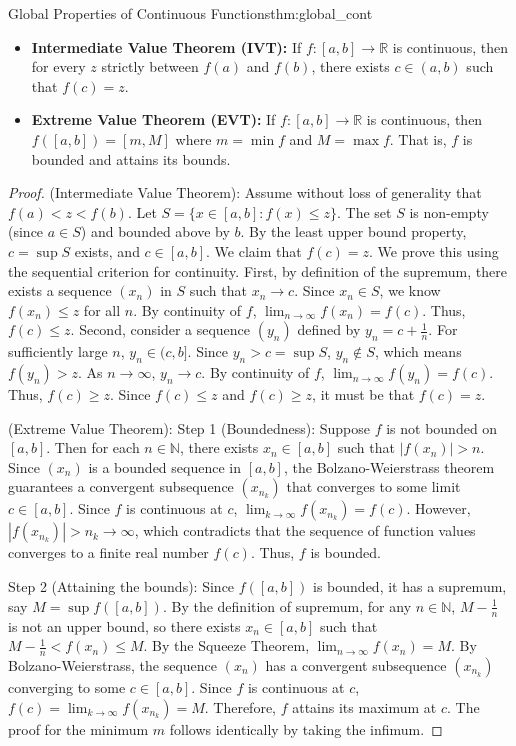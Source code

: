 \documentclass[11pt, a4paper]{article}
\begin{document}
\begin{theorem}{Global Properties of Continuous Functions}{thm:global_cont}
\begin{itemize}
    \item \textbf{Intermediate Value Theorem (IVT):} If $f: [a,b] \to \mathbb{R}$ is continuous, then for every $z$ strictly between $f(a)$ and $f(b)$, there exists $c \in (a,b)$ such that $f(c) = z$.
    \item \textbf{Extreme Value Theorem (EVT):} If $f: [a,b] \to \mathbb{R}$ is continuous, then $f([a,b]) = [m, M]$ where $m = \min f$ and $M = \max f$. That is, $f$ is bounded and attains its bounds.
\end{itemize}
\end{theorem}
\begin{proof}
(Intermediate Value Theorem): Assume without loss of generality that $f(a) < z < f(b)$.
Let $S = \{ x \in [a,b] : f(x) \le z \}$.
The set $S$ is non-empty (since $a \in S$) and bounded above by $b$. By the least upper bound property, $c = \sup S$ exists, and $c \in [a,b]$.
We claim that $f(c) = z$. We prove this using the sequential criterion for continuity.
First, by definition of the supremum, there exists a sequence $(x_n)$ in $S$ such that $x_n \to c$.
Since $x_n \in S$, we know $f(x_n) \le z$ for all $n$.
By continuity of $f$, $\lim_{n \to \infty} f(x_n) = f(c)$. Thus, $f(c) \le z$.
Second, consider a sequence $(y_n)$ defined by $y_n = c + \frac{1}{n}$. For sufficiently large $n$, $y_n \in (c, b]$.
Since $y_n > c = \sup S$, $y_n \notin S$, which means $f(y_n) > z$.
As $n \to \infty$, $y_n \to c$. By continuity of $f$, $\lim_{n \to \infty} f(y_n) = f(c)$. Thus, $f(c) \ge z$.
Since $f(c) \le z$ and $f(c) \ge z$, it must be that $f(c) = z$.

(Extreme Value Theorem): 
Step 1 (Boundedness): Suppose $f$ is not bounded on $[a,b]$. Then for each $n \in \mathbb{N}$, there exists $x_n \in [a,b]$ such that $|f(x_n)| > n$.
Since $(x_n)$ is a bounded sequence in $[a,b]$, the Bolzano-Weierstrass theorem guarantees a convergent subsequence $(x_{n_k})$ that converges to some limit $c \in [a,b]$.
Since $f$ is continuous at $c$, $\lim_{k \to \infty} f(x_{n_k}) = f(c)$. However, $|f(x_{n_k})| > n_k \to \infty$, which contradicts that the sequence of function values converges to a finite real number $f(c)$. Thus, $f$ is bounded.

Step 2 (Attaining the bounds): Since $f([a,b])$ is bounded, it has a supremum, say $M = \sup f([a,b])$.
By the definition of supremum, for any $n \in \mathbb{N}$, $M - \frac{1}{n}$ is not an upper bound, so there exists $x_n \in [a,b]$ such that $M - \frac{1}{n} < f(x_n) \le M$.
By the Squeeze Theorem, $\lim_{n \to \infty} f(x_n) = M$.
By Bolzano-Weierstrass, the sequence $(x_n)$ has a convergent subsequence $(x_{n_k})$ converging to some $c \in [a,b]$.
Since $f$ is continuous at $c$, $f(c) = \lim_{k \to \infty} f(x_{n_k}) = M$.
Therefore, $f$ attains its maximum at $c$. The proof for the minimum $m$ follows identically by taking the infimum.
\end{proof}
\end{document}
